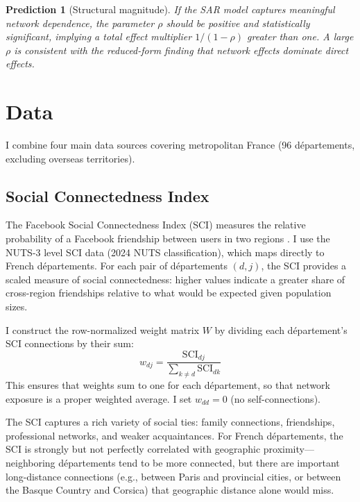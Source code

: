 \documentclass[12pt]{article}
\newcommand{\dept}{d\'{e}partement}
\newcommand{\depts}{d\'{e}partements}
\newtheorem{prediction}{Prediction}
\begin{document}
\begin{prediction}[Structural magnitude]
If the SAR model captures meaningful network dependence, the parameter $\rho$ should be positive and statistically significant, implying a total effect multiplier $1/(1-\rho)$ greater than one. A large $\rho$ is consistent with the reduced-form finding that network effects dominate direct effects.
\end{prediction}



\section{Data}
\label{sec:data}

I combine four main data sources covering metropolitan France (96 \depts{}, excluding overseas territories).

\subsection{Social Connectedness Index}

The Facebook Social Connectedness Index (SCI) measures the relative probability of a Facebook friendship between users in two regions \citep{bailey2018social}. I use the NUTS-3 level SCI data (2024 NUTS classification), which maps directly to French \depts{}. For each pair of \depts{} $(d, j)$, the SCI provides a scaled measure of social connectedness: higher values indicate a greater share of cross-region friendships relative to what would be expected given population sizes.

I construct the row-normalized weight matrix $W$ by dividing each \dept{}'s SCI connections by their sum:
\begin{equation}
w_{dj} = \frac{\text{SCI}_{dj}}{\sum_{k \neq d} \text{SCI}_{dk}}
\end{equation}
This ensures that weights sum to one for each \dept{}, so that network exposure is a proper weighted average. I set $w_{dd} = 0$ (no self-connections).

The SCI captures a rich variety of social ties: family connections, friendships, professional networks, and weaker acquaintances. For French \depts{}, the SCI is strongly but not perfectly correlated with geographic proximity---neighboring \depts{} tend to be more connected, but there are important long-distance connections (e.g., between Paris and provincial cities, or between the Basque Country and Corsica) that geographic distance alone would miss.
\end{document}

